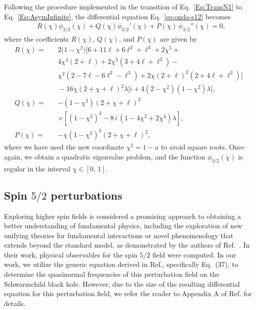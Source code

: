 Following the procedure implemented in the transition of Eq.~\eqref{Eq:TransN1} to Eq.~\eqref{Eq:AsymInfinite}, the differential equation Eq.~\eqref{eq:onda-s12} becomes
%
\begin{equation}\label{eq:onda-s32a}
  \begin{split}
    &R(\chi)\phi_{\scriptscriptstyle{3/2}}(\chi) + Q(\chi)\phi_{\scriptscriptstyle{3/2}}'(\chi) + P(\chi) \,\phi_{\scriptscriptstyle{3/2}}''(\chi)=0,
  \end{split}
\end{equation}
%
where the coefficients $R(\chi)$, $Q(\chi)$, and $P(\chi)$ are given by
%
\begin{eqnarray}
  R(\chi)=
  \,&& 2\big(1-\chi^2\big)\Big[6+11\ell+6\ell^2+\ell^3 +2\chi^5+  \nonumber\\
    &&4\chi^4(2+\ell) +2\chi^3\left(3+4\ell+\ell^2\right)- \nonumber\\
    &&\!\!\chi^2\left(2-7\ell-6\ell^2-\ell^3\right)  + 2\chi(2+\ell)^2\left(2+4\ell+\ell^2\right)\Big] \nonumber \\
  &&\! -16\chi(2+\chi+\ell)^2\lambda\Big[i + 4 \left(2-\chi^2\right)\left(1-\chi^2\right)\lambda\Big],\nonumber\\
  Q(\chi) = && -\left(1-\chi^2\right)\left(2+\chi+\ell\right)^2\nonumber\\
  && \times \left[\left(1-\chi^2\right)^2-8\,i\,(1-4\chi^2+2\chi^4)\lambda\right],\nonumber\\
  P(\chi)  =&&
  -\chi\left(1-\chi^2\right)^3\left(2+\chi+\ell\right)^2,\nonumber
\end{eqnarray}
%
where we have used the new coordinate $\chi^2=1-u$ to avoid square roots. Once again, we obtain a quadratic eigenvalue problem, and the function $\phi_{\scriptscriptstyle{3/2}}(\chi)$ is regular in the interval $\chi\in [0,\,1]$.

\subsection{Spin $5/2$ perturbations}

Exploring higher spin fields is considered a promising approach to obtaining a better understanding of fundamental physics, including the exploration of new unifying theories for fundamental interactions or novel phenomenology that extends beyond the standard model, as demonstrated by the authors of Ref.~\cite{Shklyar:2009cx}. In their work, physical observables for the spin $5/2$ field were computed. In our work, we utilize the generic equation derived in Ref.\cite{Shu:2005fw}, specifically Eq.~(37), to determine the quasinormal frequencies of this perturbation field on the Schwarzschild black hole. However, due to the size of the resulting differential equation for this perturbation field, we refer the reader to Appendix A of Ref.\cite{Mamani2022} for details.